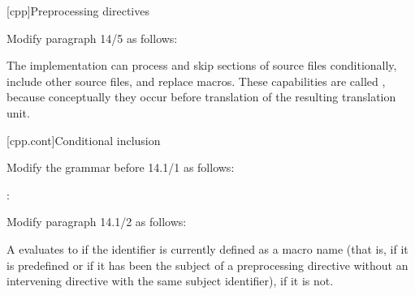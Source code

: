 \setcounter{chapter}{13}
[cpp]{Preprocessing directives}%

\begin{after}
Modify paragraph 14/5 as follows:

\begin{std.txt}
\pnum[5]
The implementation can
process and skip sections of source files conditionally,
include other source files,
and replace macros.
These capabilities are called
,
because conceptually they occur
before translation of the resulting translation unit.
\end{std.txt}
\end{after}

\setcounter{section}{0}
[cpp.cont]{Conditional inclusion}%

Modify the grammar before 14.1/1 as follows:

\begin{std.txt}
\begin{bnf}
\br
  \br
\end{bnf}

\begin{bnf}
:\br
  \br
  \br
  \br
  \br
  \br
  \br
\end{bnf}
\end{std.txt}

Modify paragraph 14.1/2 as follows:

\begin{std.txt}
\pnum[2]
A  evaluates to 
if the identifier is currently defined as a macro name
(that is, if it is predefined or if
it has been the subject of a  preprocessing directive
without an intervening  directive with the same subject
identifier),
 if it is not.

\end{std.txt}

